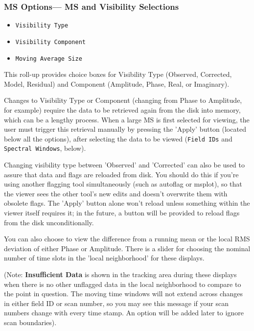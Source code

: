 \subsubsection{MS Options--- MS and Visibility Selections}
\label{section:display.ms.adjust.select}

\begin{itemize}

\item {\tt Visibility Type}

\item {\tt Visibility Component}

\item {\tt Moving Average Size}

\end{itemize}

This roll-up provides choice boxes for Visibility Type
(Observed, Corrected, Model, Residual) and Component (Amplitude,
Phase, Real, or Imaginary).  

Changes to Visibility Type or Component (changing from Phase to
Amplitude, for example) require the data to be retrieved again
from the disk into memory, which can be a lengthy process.  When a
large MS is first selected for viewing, the user must
trigger this retrieval manually by pressing the 'Apply' button
(located below all the options), after selecting the data to be
viewed ({\tt Field IDs} and {\tt Spectral Windows}, below).

Changing visibility type between 'Observed' and 'Corrected' can also be
used to assure that data and flags are reloaded from disk.  You should
do this if you're using another flagging tool simultaneously (such as 
autoflag or msplot), so that the viewer sees the other tool's new edits
and doesn't overwrite them with obsolete flags.  The 'Apply' button 
alone won't reload unless something within the viewer itself requires
it; in the future, a button will be provided to reload flags from the disk
unconditionally.  

You can also choose to view the difference from a running mean or the
local RMS deviation of either Phase or Amplitude.  There is a slider
for choosing the nominal number of time slots in the 'local neighborhood'
for these displays.

(Note: {\bf Insufficient Data} is shown in the tracking area during
these displays when there is no other unflagged data in the
local neighborhood to compare to the point in question.  The
moving time windows will not extend across changes in either field ID
or scan number, so you may see this message if your scan
numbers change with every time stamp.  An option will be added later
to ignore scan boundaries).

